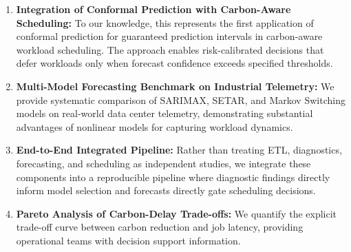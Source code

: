 \documentclass[12pt]{report}
\begin{document}
\begin{enumerate}
    \item \textbf{Integration of Conformal Prediction with Carbon-Aware Scheduling:} To our knowledge, this represents the first application of conformal prediction for guaranteed prediction intervals in carbon-aware workload scheduling. The approach enables risk-calibrated decisions that defer workloads only when forecast confidence exceeds specified thresholds.
    
    \item \textbf{Multi-Model Forecasting Benchmark on Industrial Telemetry:} We provide systematic comparison of SARIMAX, SETAR, and Markov Switching models on real-world data center telemetry, demonstrating substantial advantages of nonlinear models for capturing workload dynamics.
    
    \item \textbf{End-to-End Integrated Pipeline:} Rather than treating ETL, diagnostics, forecasting, and scheduling as independent studies, we integrate these components into a reproducible pipeline where diagnostic findings directly inform model selection and forecasts directly gate scheduling decisions.
    
    \item \textbf{Pareto Analysis of Carbon-Delay Trade-offs:} We quantify the explicit trade-off curve between carbon reduction and job latency, providing operational teams with decision support information.
\end{enumerate}
\end{document}
